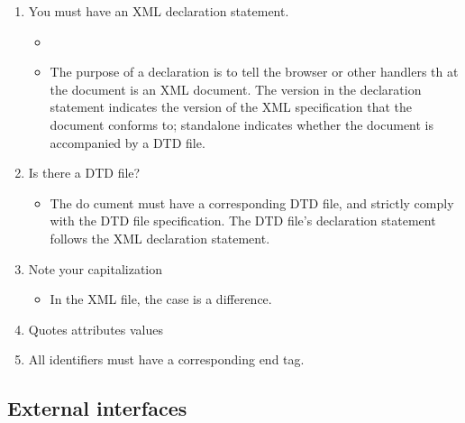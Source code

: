 \begin{enumerate}
  \item You must have an XML declaration statement.
    \begin{itemize}
      \item {}
      \item {
        The purpose of a declaration is to tell the browser or other handlers th at the document is an XML document.
        The version in the declaration statement indicates the version of the XML specification that the document conforms to; standalone indicates whether the document is accompanied by a DTD file.
      }
    \end{itemize}
    \item Is there a DTD file?
      \begin{itemize} 
        \item { 
          The do cument must have a corresponding DTD file, and strictly comply with the DTD file specification.
          The DTD file's declaration statement follows the XML declaration statement.
        }
      \end{itemize}
    \item Note your capitalization
        \begin{itemize}
            \item In the XML file, the case is a difference.
        \end{itemize} 
    \item Quotes attributes values
    \item All identifiers must have a corresponding end tag.
\end{enumerate}

\subsection{External interfaces}

